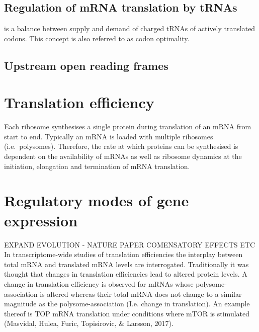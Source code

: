 \documentclass[12pt,openany]{book}
\begin{document}
\subsection{Regulation of mRNA translation by tRNAs}

is a balance between supply and demand of charged tRNAs of actively
translated codons. This concept is also referred to as codon optimality.

\subsection{Upstream open reading frames}

\section{Translation efficiency}

Each ribosome synthesises a single protein during translation of an mRNA
from start to end. Typically an mRNA is loaded with multiple ribosomes
(i.e.~polysomes). Therefore, the rate at which proteins can be
synthesised is dependent on the availability of mRNAs as well as
ribosome dynamics at the initiation, elongation and termination of mRNA
translation.

\section{Regulatory modes of gene expression}

EXPAND EVOLUTION - NATURE PAPER COMENSATORY EFFECTS ETC In
transcriptome-wide studies of translation efficiencies the interplay
between total mRNA and translated mRNA levels are interrogated.
Traditionally it was thought that changes in translation efficiencies
lead to altered protein levels. A change in translation efficiency is
observed for mRNAs whose polysome-association is altered whereas their
total mRNA does not change to a similar magnitude as the
polysome-association (I.e. change in translation). An example thereof is
TOP mRNA translation under conditions where mTOR is stimulated
(Masvidal, Hulea, Furic, Topisirovic, \& Larsson, 2017).
\end{document}
